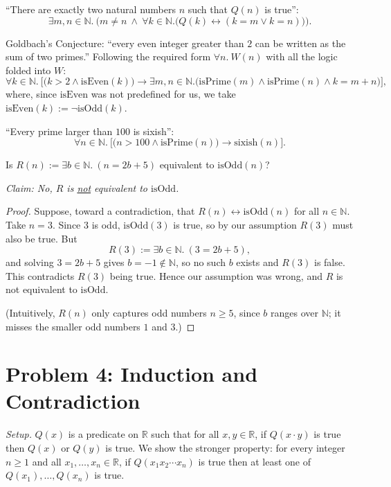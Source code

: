 \documentclass[11pt]{article}
\newcommand{\N}{\mathbb{N}}
\newcommand{\R}{\mathbb{R}}
\newcommand{\isOdd}{\mathrm{isOdd}}
\newcommand{\isPrime}{\mathrm{isPrime}}
\newcommand{\isEven}{\mathrm{isEven}}
\newcommand{\sixish}{\mathrm{sixish}}
\newcommand{\partlabel}[1]{%
    \noindent\makebox[2em][l]{\textbf{(#1)}}%
}
\begin{document}
\partlabel{b}
``There are exactly two natural numbers $n$ such that $Q(n)$ is true'':
\[
\exists m, n \in \N.\ \Big( m \ne n \ \wedge\ \forall k \in \N.\big(Q(k) \leftrightarrow (k = m \vee k = n)\big) \Big).
\]

\partlabel{c}
Goldbach's Conjecture: ``every even integer greater than $2$ can be written as the sum of two primes.'' Following the required form $\forall n.\ W(n)$ with all the logic folded into $W$:
\[
\forall k \in \N.\ \Big[ \big(k > 2 \wedge \isEven(k)\big) \rightarrow \exists m, n \in \N.\big(\isPrime(m) \wedge \isPrime(n) \wedge k = m+n\big) \Big],
\]
where, since $\isEven$ was not predefined for us, we take $\isEven(k) := \neg \isOdd(k)$.


\partlabel{d}
``Every prime larger than $100$ is sixish'':
\[
\forall n \in \N.\ \Big[ \big(n > 100 \wedge \isPrime(n)\big) \rightarrow \sixish(n) \Big].
\]

\partlabel{e}
Is $R(n) := \exists b \in \N.\ (n = 2b+5)$ equivalent to $\isOdd(n)$?

\emph{Claim: No, $R$ is \underline{not} equivalent to $\isOdd$.}

\begin{proof}
Suppose, toward a contradiction, that $R(n) \leftrightarrow \isOdd(n)$ for all $n \in \N$. Take $n = 3$. Since $3$ is odd, $\isOdd(3)$ is true, so by our assumption $R(3)$ must also be true. But
\[
R(3) := \exists b \in \N.\ (3 = 2b+5),
\]
and solving $3 = 2b+5$ gives $b = -1 \notin \N$, so no such $b$ exists and $R(3)$ is false. This contradicts $R(3)$ being true. Hence our assumption was wrong, and $R$ is not equivalent to $\isOdd$.

(Intuitively, $R(n)$ only captures odd numbers $n \ge 5$, since $b$ ranges over $\N$; it misses the smaller odd numbers $1$ and $3$.)
\end{proof}

\section*{Problem 4: Induction and Contradiction}

\partlabel{a}
\emph{Setup.} $Q(x)$ is a predicate on $\R$ such that for all $x, y \in \R$, if $Q(x \cdot y)$ is true then $Q(x)$ or $Q(y)$ is true. We show the stronger property: for every integer $n \ge 1$ and all $x_1, \dots, x_n \in \R$, if $Q(x_1 x_2 \cdots x_n)$ is true then at least one of $Q(x_1), \dots, Q(x_n)$ is true.
\end{document}
